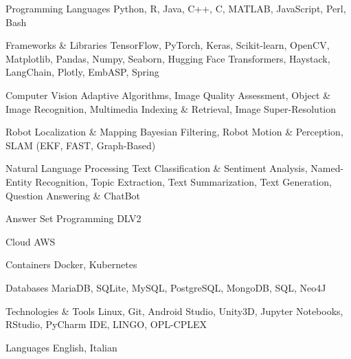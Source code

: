

\begin{cvskills}
    
\cvskill
{Programming Languages}
{Python, R, Java, C++, C, MATLAB, JavaScript, Perl, Bash}

\cvskill
{Frameworks \& Libraries}
{TensorFlow, PyTorch, Keras, Scikit-learn, OpenCV, Matplotlib, Pandas, Numpy, Seaborn, Hugging Face Transformers, Haystack, LangChain, Plotly, EmbASP, Spring}

\cvskill
{Computer Vision}
{Adaptive Algorithms, Image Quality Assessment, Object \& Image Recognition, Multimedia Indexing \& Retrieval, Image Super-Resolution}

\cvskill
{Robot Localization \& Mapping}
{Bayesian Filtering, Robot Motion \& Perception, SLAM (EKF, FAST, Graph-Based)}

\cvskill
{Natural Language Processing}
{Text Classification \& Sentiment Analysis, Named-Entity Recognition, Topic Extraction, Text Summarization, Text Generation, Question Answering \& ChatBot}

\cvskill
{Answer Set Programming}
{DLV2}


\cvskill
{Cloud}
{AWS}

\cvskill
{Containers}
{Docker, Kubernetes}

\cvskill
{Databases}
{MariaDB, SQLite, MySQL, PostgreSQL, MongoDB, SQL, Neo4J}

\cvskill
{Technologies \& Tools}
{Linux, Git, Android Studio, Unity3D, Jupyter Notebooks, RStudio, PyCharm IDE, LINGO, OPL-CPLEX}

\cvskill
{Languages}
{English, Italian}

\end{cvskills}
